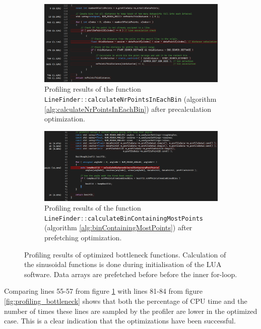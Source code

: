 \begin{figure}[H]
    \centering
    \begin{subfigure}{\textwidth}
        \centering
        \includegraphics[width=\textwidth]{images/profiling_bottleneck_optimized.png}
        \caption{Profiling results of the function \lstinline[language=c]|LineFinder::calculateNrPointsInEachBin| (algorithm \ref{alg:calculateNrPointsInEachBin}) after precalculation optimization.}
    \end{subfigure}
    \begin{subfigure}{\textwidth}
        \centering
        \includegraphics[width=\textwidth]{images/profiling_results_precalculation.png}
        \caption{Profiling results of the function \lstinline[language=c]|LineFinder::calculateBinContainingMostPoints| (algorithm \ref{alg:binContainingMostPoints}) after prefetching optimization.}\label{fig:profiling_results_precalculation}
    \end{subfigure}
    \caption{Profiling results of optimized bottleneck functions. Calculation of the sinusoidal functions is done during initialisation of the LUA software. Data arrays are prefetched before before the inner for-loop.}
    \label{fig:profiling_bottleneck_optimized}
\end{figure}

Comparing lines 55-57 from figure \ref{fig:profiling_results_precalculation} with lines 81-84 from figure \ref{fig:profiling_bottleneck} shows that both the percentage of CPU time and the number of times these lines are sampled by the profiler are lower in the optimized case. This is a clear indication that the optimizations have been successful.

